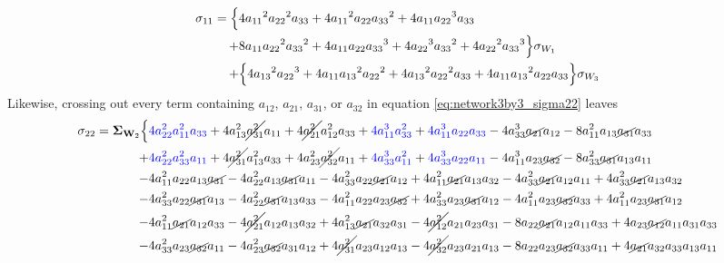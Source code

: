 \documentclass{article}
\begin{document}
\begin{align*}
\sigma_{11}= \Bigl\{ & 4{a_{11}}^2{a_{22}}^2a_{33}+4{a_{11}}^2a_{22}{a_{33}}^2+4a_{11}{a_{22}}^3a_{33} \\
+&8a_{11}{a_{22}}^2{a_{33}}^2+4a_{11}a_{22}{a_{33}}^3+4{a_{22}}^3{a_{33}}^2+4{a_{22}}^2{a_{33}}^3 \Bigr\}\sigma_{W_{1}} \\
+&\Bigl\{4{a_{13}}^2{a_{22}}^3+4a_{11}{a_{13}}^2{a_{22}}^2+4{a_{13}}^2{a_{22}}^2a_{33}+4a_{11}{a_{13}}^2a_{22}a_{33}\Bigr\} \sigma_{W_{3}}
\end{align*}
Likewise, crossing out every term containing $a_{12}$, $a_{21}$, $a_{31}$, or $a_{32}$
in equation \ref{eq:network3by3_sigma22} leaves
\begin{equation}
\begin{aligned}
 \sigma_{22} =  \mathbf{\Sigma}_{\textbf{W}_{2}} \Bigl\{ & \textcolor{blue}{4 a_{22}^{2} a_{11}^{2} a_{33}} + 4 a_{13}^{2} \cancel{a_{31}^{2}} a_{11} + 4 \cancel{a_{21}^{2}} a_{12}^{2} a_{33} + \textcolor{blue}{4 a_{11}^{3} a_{33}^{2}} + \textcolor{blue}{4 a_{11}^{3} a_{22} a_{33}} - 4 a_{33}^{3} \cancel{a_{21}} a_{12} - 8 a_{11}^{2} a_{13} \cancel{a_{31}} a_{33} \\
+& \textcolor{blue}{4 a_{22}^{2} a_{33}^{2} a_{11}} + 4 \cancel{a_{31}^{2}} a_{13}^{2} a_{33} + 4 a_{23}^{2} \cancel{a_{32}^{2}} a_{11} + \textcolor{blue}{4 a_{33}^{3} a_{11}^{2}} + \textcolor{blue}{4 a_{33}^{3} a_{22} a_{11}} - 4 a_{11}^{3} a_{23} \cancel{a_{32}} - 8 a_{33}^{2} \cancel{a_{31}} a_{13} a_{11} \\
-& 4 a_{11}^{2} a_{22} a_{13} \cancel{a_{31}} - 4 a_{22}^{2} a_{13} \cancel{a_{31}} a_{11} - 4 a_{33}^{2} a_{22} \cancel{a_{21}} a_{12} + 4 a_{11}^{2} \cancel{a_{21}} a_{13} a_{32} - 4 a_{33}^{2} \cancel{a_{21}} a_{12} a_{11} + 4 a_{33}^{2} \cancel{a_{21}} a_{13} a_{32} \\
-& 4 a_{33}^{2} a_{22} \cancel{a_{31}} a_{13} - 4 a_{22}^{2} \cancel{a_{31}} a_{13} a_{33} - 4 a_{11}^{2} a_{22} a_{23} \cancel{a_{32}} + 4 a_{33}^{2} a_{23} \cancel{a_{31}} a_{12} - 4 a_{11}^{2} a_{23} \cancel{a_{32}} a_{33} + 4 a_{11}^{2} a_{23} \cancel{a_{31}} a_{12} \\
-& 4 a_{11}^{2} \cancel{a_{21}} a_{12} a_{33} - 4 \cancel{a_{21}^{2}} a_{12} a_{13} a_{32} + 4 a_{13}^{2} \cancel{a_{21}} a_{32} a_{31} - 4 \cancel{a_{12}^{2}} a_{21} a_{23} a_{31} - 8 a_{22} \cancel{a_{21}} a_{12} a_{11} a_{33} + 4 a_{23} \cancel{a_{12}} a_{11} a_{31} a_{33} \\
-& 4 a_{33}^{2} a_{23} \cancel{a_{32}} a_{11} - 4 a_{23}^{2} \cancel{a_{32}} a_{31} a_{12} + 4 \cancel{a_{31}^{2}} a_{23} a_{12} a_{13} - 4 \cancel{a_{32}^{2}} a_{23} a_{21} a_{13} - 8 a_{22} a_{23} \cancel{a_{32}} a_{33} a_{11} + 4 \cancel{a_{21}} a_{32} a_{33} a_{13} a_{11} \\

\end{aligned}
\end{equation}
\end{document}
